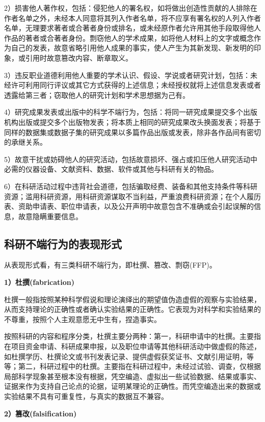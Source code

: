 2）损害他人著作权，包括：侵犯他人的署名权，如将做出创造性贡献的人排除在作者名单之外，未经本人同意将其列入作者名单，将不应享有署名权的人列入作者名单，无理要求著者或合著者身份或排名，或未经原作者允许用其他手段取得他人作品的著者或合著者身份。剽窃他人的学术成果，如将他人材料上的文字或概念作为自己的发表，故意省略引用他人成果的事实，使人产生为其新发现、新发明的印象，或引用时故意篡改内容、断章取义。

3）违反职业道德利用他人重要的学术认识、假设、学说或者研究计划，包括：未经许可利用同行评议或其它方式获得的上述信息；未经授权就将上述信息发表或者透露给第三者；窃取他人的研究计划和学术思想据为己有。

4）研究成果发表或出版中的科学不端行为，包括：将同一研究成果提交多个出版机构出版或提交多个出版物发表；将本质上相同的研究成果改头换面发表；将基于同样的数据集或数据子集的研究成果以多篇作品出版或发表，除非各作品间有密切的承继关系。

5）故意干扰或妨碍他人的研究活动，包括故意损坏、强占或扣压他人研究活动中必需的仪器设备、文献资料、数据、软件或其他与科研有关的物品。

6）在科研活动过程中违背社会道德，包括骗取经费、装备和其他支持条件等科研资源；滥用科研资源，用科研资源谋取不当利益，严重浪费科研资源；在个人履历表、资助申请表、职位申请表，以及公开声明中故意包含不准确或会引起误解的信息，故意隐瞒重要信息。

\subsection{科研不端行为的表现形式}

从表现形式看，有三类科研不端行为，即杜撰、篡改、剽窃(FFP)。

\textbf{1）杜撰(fabrication)}

杜撰一般指按照某种科学假说和理论演绎出的期望值伪造虚假的观察与实验结果，从而支持理论的正确性或者确认实验结果的正确性。它表现为对科学和实验结果的不尊重，按照个人主观意愿无中生有，捏造事实。

按照科研的内容和程序分类，杜撰主要分两种：第一，科研申请中的杜撰。主要指在项目资金申请、科研成果申报，以及职位申请等其他科研活动中做虚假的陈述，如杜撰学历、杜撰论文或书刊发表记录、提供虚假获奖证书、文献引用证明，等等；第二，科研过程中的杜撰。主要指在科研过程中，未经过试验、调查，仅根据局部科学现象甚至根本没有根据，凭空编造、虚拟出一些试验数据、结果或事实、证据来作为支持自己论点的论据，证明某理论的正确性。而凭空编造出来的数据或实验结果不具有可重复性，与真实的数据互不兼容。

\textbf{2）篡改(falsification)}

